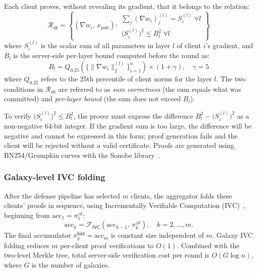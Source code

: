 \documentclass[10pt,twocolumn,letterpaper]{article}
\begin{document}
Each client proves, without revealing its gradient, that it belongs to the relation:
\begin{equation}
\mathcal{R}_{\mathrm{zk}} = \left\{
(\nabla w_i,\, x_{\mathrm{pub}}) :\!
\begin{array}{l}
  \textstyle\sum\nolimits_j (\nabla w_i)_j^{(l)} = S_i^{(l)} \;\forall l \\[3pt]
  \bigl(S_i^{(l)}\bigr)^2 \leq B_l^2 \;\forall l
\end{array}
\right\}
\label{eq:zk_relation}
\end{equation}
where $S_i^{(l)}$ is the scalar sum of all parameters in layer $l$ of client $i$'s gradient, and $B_l$ is the server-side per-layer bound computed before the round as:
\begin{equation}
B_l = Q_{0.25}\!\left(\{\|\nabla w_i\|_2^{(l)}\}_{i=1}^n\right) \times (1 + \gamma),\quad \gamma = 5
\label{eq:bound}
\end{equation}
where $Q_{0.25}$ refers to the 25th percentile of client norms for the layer $l$. The two conditions in $\mathcal{R}_\mathrm{zk}$ are referred to as \emph{sum correctness} (the sum equals what was committed) and \emph{per-layer bound} (the sum does not exceed $B_l$).

To verify $\bigl(S_i^{(l)}\bigr)^2 \leq B_l^2$, the prover must express the difference $B_l^2 - \bigl(S_i^{(l)}\bigr)^2$ as a non-negative 64-bit integer. If the gradient sum is too large, the difference will be negative and cannot be expressed in this form; proof generation fails and the client will be rejected without a valid certificate. Proofs are generated using BN254/Grumpkin curves with the Sonobe library~\cite{sonobe2024}.


\subsubsection{Galaxy-level IVC folding}

After the defense pipeline has selected $m$ clients, the aggregator folds these clients' proofs in sequence, using Incrementally Verifiable Computation (IVC)~\cite{valiant2008incrementally}, beginning from $\mathrm{acc}_1 = \pi_1^{zk}$:
\begin{equation}
\mathrm{acc}_{k} = \mathcal{F}_{\mathsf{IVC}}(\mathrm{acc}_{k-1},\, \pi_k^{zk}), \quad k = 2, \dots, m.
\label{eq:ivc_fold}
\end{equation}
The final accumulator $\pi_g^{\mathsf{fold}} = \mathrm{acc}_m$ is constant size independent of $m$. Galaxy IVC folding reduces $m$ per-client proof verifications to $O(1)$. Combined with the two-level Merkle tree, total server-side verification cost per round is $O(G \log n)$, where $G$ is the number of galaxies.
\end{document}
